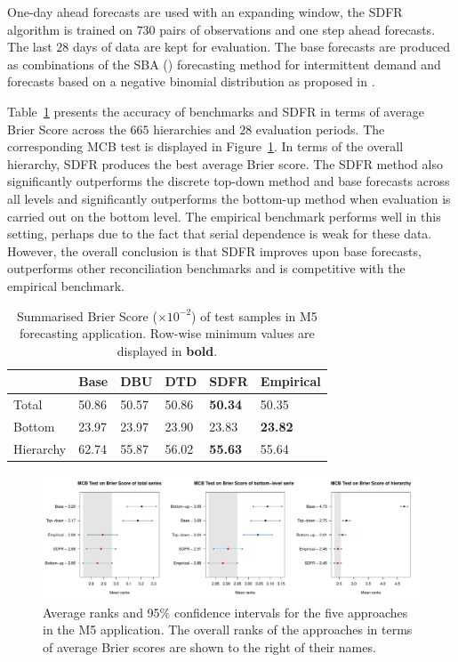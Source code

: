 \documentclass[a4paper,review,12pt,authoryear]{elsarticle}
\theoremstyle{definition}
\begin{document}
     One-day ahead forecasts are used with an expanding window, the SDFR algorithm is trained on $730$ pairs of observations and one step ahead forecasts. The last $28$ days of data are kept for evaluation. The base forecasts are produced as combinations of the SBA (\citealp{syntetosAccuracyIntermittentDemand2005}) forecasting method for intermittent demand and forecasts based on a negative binomial distribution as proposed in \cite{kolassaEvaluatingPredictiveCount2016}.

    Table~\ref{tab:M5} presents the accuracy of benchmarks and SDFR in terms of average Brier Score across the $665$ hierarchies and $28$ evaluation periods. The corresponding MCB test is displayed in Figure~\ref{fig:application_M5}. In terms of the overall hierarchy, SDFR produces the best average Brier score. The SDFR method also significantly outperforms the discrete top-down method and base forecasts across all levels and significantly outperforms the bottom-up method when evaluation is carried out on the bottom level. The empirical benchmark performs well in this setting, perhaps due to the fact that serial dependence is weak for these data. However, the overall conclusion is that SDFR improves upon base forecasts, outperforms other reconciliation benchmarks and is competitive with the empirical benchmark.
   
    \begin{table}
        \centering
        \begin{tabular}{llllll}\toprule
            ~ & Base & DBU & DTD & SDFR & Empirical \\ \midrule
            Total & 50.86 & 50.57 & 50.86 & \textbf{50.34} & 50.35 \\ 
            Bottom & 23.97 & 23.97 & 23.90 & 23.83 & \textbf{23.82} \\ 
            Hierarchy & 62.74 & 55.87 & 56.02 & \textbf{55.63} & 55.64 \\ \bottomrule
        \end{tabular}
        \caption{\label{tab:M5}Summarised Brier Score ($\times 10^{-2}$) of test samples in M5 forecasting application. Row-wise minimum values are displayed in \textbf{bold}.}
    \end{table}


    \begin{figure}[h]
      \caption{\label{fig:application_M5}Average ranks and 95\% confidence intervals for the five approaches in the M5 application. The overall ranks of the approaches in terms of average Brier scores are shown to the right of their names.}
      \centering
      \includegraphics[width=\textwidth]{figures/M5_mcb.pdf}
    \end{figure}
\end{document}
